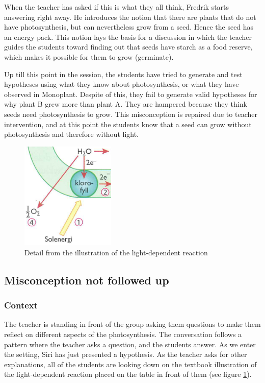 When the teacher has asked if this is what they all think, Fredrik starts answering right away. He introduces the notion that there are plants that do not have photosynthesis, but can nevertheless grow from a seed. Hence the seed has an energy pack. This notion lays the basis for a discussion in which the teacher guides the students toward finding out that seeds have starch as a food reserve, which makes it possible for them to grow (germinate). 

Up till this point in the session, the students have tried to generate and test hypotheses using what they know about photosynthesis, or what they have observed in Monoplant. Despite of this, they fail to generate valid hypotheses for why plant B grew more than plant A. They are hampered because they think seeds need photosynthesis to grow. This misconception is repaired due to teacher intervention, and at this point the students know that a seed can grow without photosynthesis and therefore without light.

\begin{figure}
\centering
\includegraphics[width=0.4\textwidth]{img/data_analysis/light_dependent_detail.png}
\caption{Detail from the illustration of the light-dependent reaction \citep{bios}}
\label{fig:lightdependentdetail}
\end{figure}

\subsection{Misconception not followed up}

\subsubsection*{Context}
The teacher is standing in front of the group asking them questions to make them reflect on different aspects of the photosynthesis. The conversation follows a pattern where the teacher asks a question, and the students answer. As we enter the setting, Siri has just presented a hypothesis. As the teacher asks for other explanations, all of the students are looking down on the textbook illustration of the light-dependent reaction placed on the table in front of them (see figure \ref{fig:lightdependentdetail}). 


